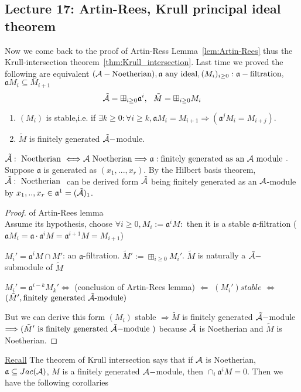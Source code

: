\documentclass[11pt]{article}
\newcommand{\sca}{{\mathfrak a}}
\newcommand{\cala}{{\cal A}}
\newcommand{\Lrta}{\Longrightarrow}
\newcommand{\Llta}{\Longleftarrow}
\newcommand{\Llrta}{\Longleftrightarrow}
\begin{document}
\subsection{Lecture 17: Artin-Rees, Krull principal ideal theorem}
Now we come back to the proof of Artin-Ress Lemma~\ref{lem:Artin-Rees} thus the Krull-intersection theorem~\ref{thm:Krull_intersection}. Last time we proved the following are equivalent $(\cala-\text{Noetherian}), \sca\text{ any ideal}, (M_i)_{i\geq 0}:\sca-\text{filtration}, $ $\sca M_i\subseteq M_{i+1}$\\
$$
\tilde{\cala}=\boxplus_{i\geq 0}\sca^i,\ \  \tilde{M}=\boxplus_{i\geq 0} M_i
$$ 
\begin{enumerate}[label=(\roman*)]
\item $(M_i)$ is stable,i.e.  if $\exists k\geq 0:\forall i\geq k,\sca M_i=M_{i+1}\Lrta(\sca^j M_i=M_{i+j})$.
\item $\tilde{M}$ is finitely generated $\tilde{\cala}-$module.
\end{enumerate}
$\tilde{\cala}:\text{ Noetherian }\Llrta \cala \text{ Noetherian}\Lrta \sca: \text{finitely generated as an $\cala$ module }$. Suppose $\sca$ is generated as $(x_1,...,x_r)$. By the Hilbert basis theorem, $\tilde{\cala}:\text{ Noetherian }$ can be derived form $\tilde{\cala}$ being finitely generated as an $\cala$-module by $x_1,..,x_r\in\sca^1= (\tilde{\cala})_1$.

\begin{proof} of Artin-Rees lemma\\
Assume its hypothesis, choose $\forall i\geq 0, M_i:=\sca^i M:$ then it is a stable $\sca$-filtration ($\sca M_i=\sca\cdot \sca^i M=\sca^{i+1}M=M_{i+1}$)

$M_i'=\sca^i M\cap M'$: an $\sca$-filtration. $\tilde{M}':=\boxplus_{i\geq 0}M_i'$. $\tilde{M}$ is naturally a $\tilde{\cala}-$submodule of $\tilde{M}$

$M_i'=\sca^{i-k}M_k'\Llrta $ (conclusion of Artin-Rees lemma) $\Llta$ $(M_i') stable$ $\Llrta$ $(\tilde{M}',\text{finitely generated $\tilde{\cala}$-module})$

But we can derive this form $(M_i)$ stable $\Lrta\tilde{M} $  is finitely generated $\tilde{\cala}-$module $\Lrta (\tilde{M}'\text{ is finitely generated $\tilde{\cala}-$module })$ because $\tilde{\cala}$ is Noetherian and $\tilde{M}$ is Noetherian.
\end{proof}
\underline{Recall}
The theorem of Krull intersection says that if $\cala$ is Noetherian, $\sca\subseteq Jac(\cala)$, $M$ is a finitely generated $\cala-$module, then $\cap_i\sca^i M=0$. Then we have the following corollaries
\end{document}
